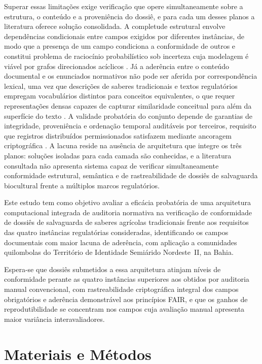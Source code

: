 \documentclass[preprint,12pt,authoryear]{elsarticle}
\begin{document}
Superar essas limitações exige verificação que opere simultaneamente sobre a estrutura, o conteúdo e a proveniência do dossiê, e para cada um desses planos a literatura oferece solução consolidada. A completude estrutural envolve dependências condicionais entre campos exigidos por diferentes instâncias, de modo que a presença de um campo condiciona a conformidade de outros e constitui problema de raciocínio probabilístico sob incerteza cuja modelagem é viável por grafos direcionados acíclicos \citep{Pearl2009,Koller2009}. Já a aderência entre o conteúdo documental e os enunciados normativos não pode ser aferida por correspondência lexical, uma vez que descrições de saberes tradicionais e textos regulatórios empregam vocabulários distintos para conceitos equivalentes, o que requer representações densas capazes de capturar similaridade conceitual para além da superfície do texto \citep{Reimers2019,Devlin2019}. A validade probatória do conjunto depende de garantias de integridade, proveniência e ordenação temporal auditáveis por terceiros, requisito que registros distribuídos permissionados satisfazem mediante ancoragem criptográfica \citep{Hyperledger2020}. A lacuna reside na ausência de arquitetura que integre os três planos: soluções isoladas para cada camada são conhecidas, e a literatura consultada não apresenta sistema capaz de verificar simultaneamente conformidade estrutural, semântica e de rastreabilidade de dossiês de salvaguarda biocultural frente a múltiplos marcos regulatórios.

Este estudo tem como objetivo avaliar a eficácia probatória de uma arquitetura computacional integrada de auditoria normativa na verificação de conformidade de dossiês de salvaguarda de saberes agrícolas tradicionais frente aos requisitos das quatro instâncias regulatórias consideradas, identificando os campos documentais com maior lacuna de aderência, com aplicação a comunidades quilombolas do Território de Identidade Semiárido Nordeste~II, na Bahia.

Espera-se que dossiês submetidos a essa arquitetura atinjam níveis de conformidade perante as quatro instâncias superiores aos obtidos por auditoria manual convencional, com rastreabilidade criptográfica integral dos campos obrigatórios e aderência demonstrável aos princípios FAIR, e que os ganhos de reprodutibilidade se concentram nos campos cuja avaliação manual apresenta maior variância interavaliadores.


\section{Materiais e Métodos}
\end{document}
